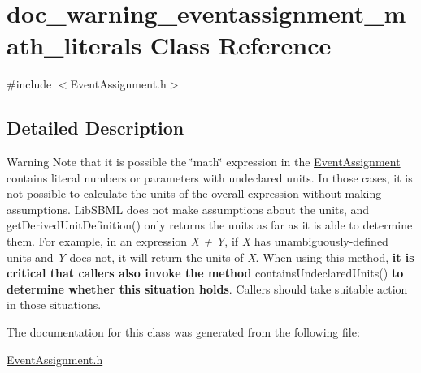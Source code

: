 \hypertarget{classdoc__warning__eventassignment__math__literals}{}\section{doc\+\_\+warning\+\_\+eventassignment\+\_\+math\+\_\+literals Class Reference}
\label{classdoc__warning__eventassignment__math__literals}


{\ttfamily \#include $<$Event\+Assignment.\+h$>$}



\subsection{Detailed Description}
\begin{DoxyWarning}{Warning}
Note that it is possible the \char`\"{}math\char`\"{} expression in the \hyperlink{class_event_assignment}{Event\+Assignment} contains literal numbers or parameters with undeclared units. In those cases, it is not possible to calculate the units of the overall expression without making assumptions. Lib\+S\+B\+ML does not make assumptions about the units, and get\+Derived\+Unit\+Definition() only returns the units as far as it is able to determine them. For example, in an expression {\itshape X + Y}, if {\itshape X} has unambiguously-\/defined units and {\itshape Y} does not, it will return the units of {\itshape X}. When using this method, {\bfseries it is critical that callers also invoke the method} contains\+Undeclared\+Units() {\bfseries to determine whether this situation holds}. Callers should take suitable action in those situations. 
\end{DoxyWarning}


The documentation for this class was generated from the following file\+:\begin{DoxyCompactItemize}
\item 
\hyperlink{_event_assignment_8h}{Event\+Assignment.\+h}\end{DoxyCompactItemize}
